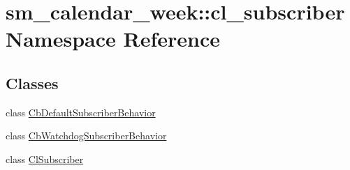 \hypertarget{namespacesm__calendar__week_1_1cl__subscriber}{}\section{sm\+\_\+calendar\+\_\+week\+:\+:cl\+\_\+subscriber Namespace Reference}
\label{namespacesm__calendar__week_1_1cl__subscriber}
\subsection*{Classes}
\begin{DoxyCompactItemize}
\item 
class \hyperlink{classsm__calendar__week_1_1cl__subscriber_1_1CbDefaultSubscriberBehavior}{Cb\+Default\+Subscriber\+Behavior}
\item 
class \hyperlink{classsm__calendar__week_1_1cl__subscriber_1_1CbWatchdogSubscriberBehavior}{Cb\+Watchdog\+Subscriber\+Behavior}
\item 
class \hyperlink{classsm__calendar__week_1_1cl__subscriber_1_1ClSubscriber}{Cl\+Subscriber}
\end{DoxyCompactItemize}
